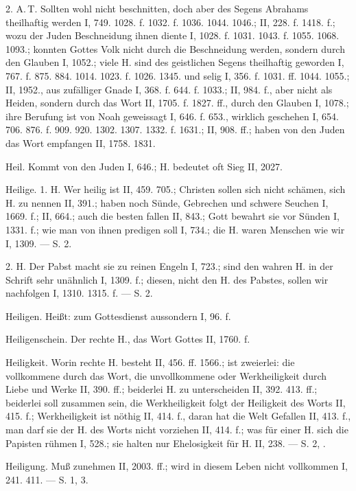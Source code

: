 2.  A.\,T. Sollten wohl nicht beschnitten, doch aber des Segens Abrahams theilhaftig werden I, 749. 1028. f. 1032. f. 1036. 1044. 1046.; II, 228. f. 1418. f.; wozu der Juden Beschneidung ihnen diente I, 1028. f. 1031. 1043. f. 1055. 1068. 1093.; konnten Gottes Volk nicht durch die Beschneidung werden, sondern durch den Glauben I, 1052.; viele H. sind des geistlichen Segens theilhaftig geworden I, 767. f. 875. 884. 1014. 1023. f. 1026. 1345. und selig I, 356. f. 1031. ff. 1044. 1055.; II, 1952., aus zufälliger Gnade I, 368. f. 644. f. 1033.; II, 984. f., aber nicht als Heiden, sondern durch das Wort II, 1705. f. 1827. ff., durch den Glauben I, 1078.; ihre Berufung ist von Noah geweissagt I, 646. f. 653., wirklich geschehen I, 654. 706. 876. f. 909. 920. 1302. 1307. 1332. f. 1631.; II, 908. ff.; haben von den Juden das Wort empfangen II, 1758. 1831.

Heil. Kommt von den Juden I, 646.; H. bedeutet oft Sieg II, 2027.

Heilige. 1.  H. Wer heilig ist II, 459. 705.; Christen sollen sich nicht schämen, sich H. zu nennen II, 391.; haben noch Sünde, Gebrechen und schwere Seuchen I, 1669. f.; II, 664.; auch die besten fallen II, 843.; Gott bewahrt sie vor Sünden I, 1331. f.; wie man von ihnen predigen soll I, 734.; die H. waren Menschen wie wir I, 1309. — S.  2.

2.  H.  Der Pabst macht sie zu reinen Engeln I, 723.; sind den wahren H. in der Schrift sehr unähnlich I, 1309. f.; diesen, nicht den H. des Pabstes, sollen wir nachfolgen I, 1310. 1315. f. — S.  2.

Heiligen. Heißt: zum Gottesdienst aussondern I, 96. f.

Heiligenschein. Der rechte H., das Wort Gottes II, 1760. f.

Heiligkeit. Worin rechte H. besteht II, 456. ff. 1566.; ist zweierlei: die vollkommene durch das Wort, die unvollkommene oder Werkheiligkeit durch Liebe und Werke II, 390. ff.; beiderlei H. zu unterscheiden II, 392. 413. ff.; beiderlei soll zusammen sein, die Werkheiligkeit folgt der Heiligkeit des Worts II, 415. f.; Werkheiligkeit ist nöthig II, 414. f., daran hat die Welt Gefallen II, 413. f., man darf sie der H. des Worts nicht vorziehen II, 414. f.; was für einer H. sich die Papisten rühmen I, 528.; sie halten nur Ehelosigkeit für H. II, 238. — S.  2, .

Heiligung. Muß zunehmen II, 2003. ff.; wird in diesem Leben nicht vollkommen I, 241. 411. — S.  1,  3.

